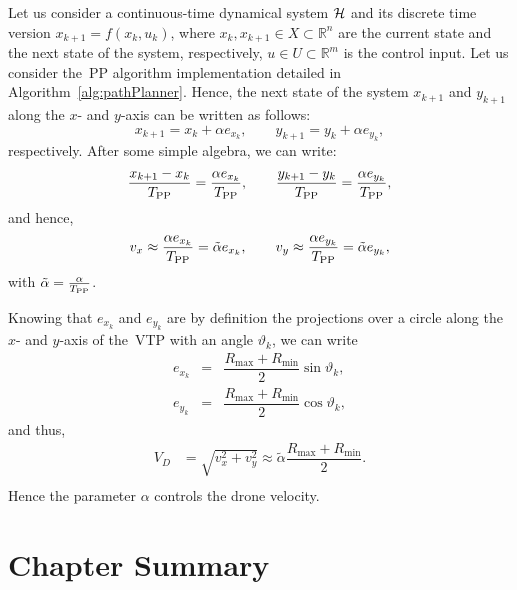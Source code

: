 Let us consider a continuous-time dynamical system $\mathcal{H}$ and its discrete time version $x_{k+1}=f(x_k,u_k)$, where $x_k, x_{k+1} \in X \subset \mathbb{R}^n$ are the current state and the next state of the system, respectively, $u \in U \subset \mathbb{R}^m$ is the control input. Let us consider the~\gls{PP} algorithm implementation detailed in Algorithm~\ref{alg:pathPlanner}. Hence, the next state of the system $x_{k+1}$ and $y_{k+1}$ along the $x$- and $y$-axis can be written as follows:
%
\begin{equation}
	x_{k+1} = x_k + \alpha e_{x_k}, \qquad y_{k+1} = y_k + \alpha e_{y_k},
\end{equation}
%
respectively. After some simple algebra, we can write:
%
\begin{equation}
	\dfrac{x_{k+1}-x_k}{T_{\rm PP}} = \dfrac{\alpha e_{x_k}}{T_{\rm PP}}, \qquad 
	\dfrac{y_{k+1}-y_k}{T_{\rm PP}} = \dfrac{\alpha e_{y_k}}{T_{\rm PP}}, 
\end{equation}
%
and hence,
%
\begin{equation}
	v_x \approx \dfrac{\alpha e_{x_k}}{T_{\rm PP}} = \tilde{\alpha} e_{x_k}, \qquad 
	v_y  \approx  \dfrac{\alpha e_{y_k}}{T_{\rm PP}} = \tilde{\alpha} e_{y_k},
\end{equation}
%
with $\tilde{\alpha} = \frac{\alpha}{T_{\rm PP}}$.

Knowing that $e_{x_k}$ and $e_{y_k}$ are by definition the projections over a circle along the $x$- and $y$-axis of the~\gls{VTP} with an angle $\vartheta_k$, we can write
%
\begin{equation}
	\begin{array}{rll}
		e_{x_k} &=& \dfrac{R_\mathrm{max}+R_\mathrm{min}}{2} \sin{\vartheta_k},\\[10pt]
		e_{y_k} &=& \dfrac{R_\mathrm{max}+R_\mathrm{min}}{2} \cos{\vartheta_k},
	\end{array}
\end{equation}
%
and thus,
%
\begin{equation} 
	\begin{split}
		V_D & = \sqrt{v_x^2 + v_y^2} \approx \tilde{\alpha} \dfrac{R_\mathrm{max}+R_\mathrm{min}}{2}. \\
	\end{split}
\end{equation}
%
Hence the parameter $\alpha$ controls the drone velocity. 






\newpage
\section{Chapter Summary}


